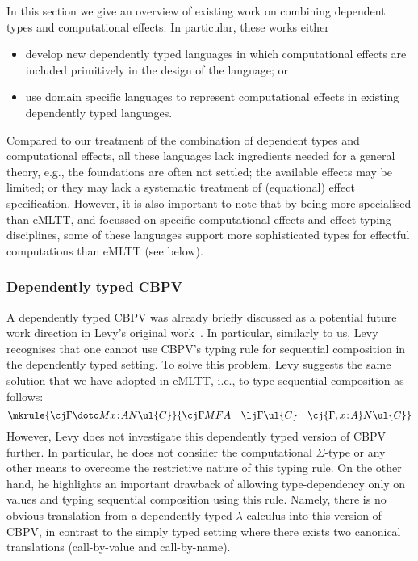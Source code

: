 In this section we give an overview of existing work on combining dependent types and computational effects. In particular, these works either 
\begin{itemize}
\item develop new dependently typed languages in which computational effects are included primitively in the design of the language; or 
\item use domain specific languages to represent computational effects in existing dependently typed languages.
\end{itemize}

Compared to our treatment of the combination of dependent types and computational effects, all these languages lack ingredients needed for a general theory, e.g., the foundations are often not settled; the available effects may be limited; or they may lack a systematic treatment of (equational) effect specification. However, it is also important to note that by being more specialised than eMLTT, and focussed on specific computational effects and effect-typing disciplines, some of these languages support more sophisticated types for effectful computations than eMLTT (see below). 

\subsubsection*{Dependently typed CBPV}

A dependently typed CBPV was already briefly discussed as a potential future work direction in Levy's original work~\cite[Section~12.4.1]{Levy:CBPV}. In particular, similarly to us, Levy recognises that one cannot use CBPV's typing rule for sequential composition in the dependently typed setting. 
To solve this problem, Levy suggests the same solution that we have adopted in eMLTT, i.e., to type sequential composition as follows:
\vspace{0.2cm}
\[
\mkrule
{\cj \Gamma {\doto M {x \!:\! A} {} N} {\ul{C}}}
{
\cj \Gamma M FA
\quad
\lj \Gamma \ul{C}
\quad
\cj {\Gamma, x \!:\! A} N \ul{C}
}
\vspace{-0.1cm}
\]
However, Levy does not investigate this dependently typed version of CBPV further. In particular, he does not consider the computational $\Sigma$-type or any other means to overcome the restrictive nature of this typing rule. 
On the other hand, he highlights an important drawback of allowing type-dependency only on values and typing sequential composition using this rule. Namely, there is no obvious translation from a dependently typed $\lambda$-calculus into this version of CBPV, in contrast to the simply typed setting where there exists two canonical translations (call-by-value and call-by-name).


